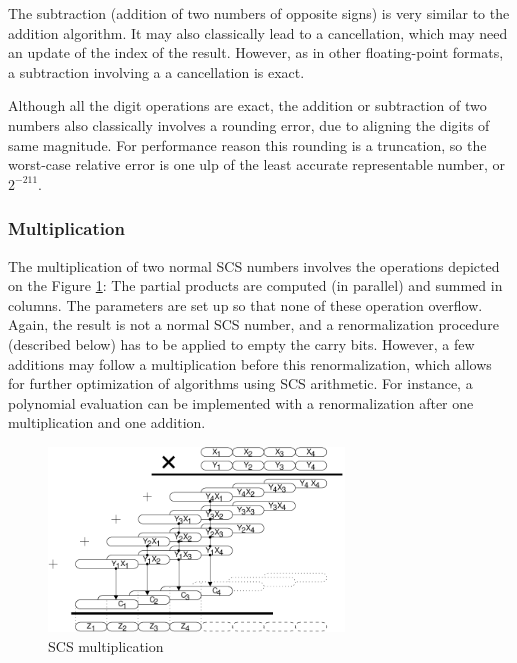 The subtraction (addition of two numbers of opposite signs) is very
similar to the addition algorithm. It may also classically lead to a
cancellation, which may need an update of the index of the result.
However, as in other floating-point formats, a subtraction involving a
a cancellation is exact.

Although all the digit operations are exact, the addition or
subtraction of two numbers also classically involves a rounding error,
due to aligning the digits of same magnitude. For performance reason
this rounding is a truncation, so the worst-case relative error is one
ulp of the least accurate representable number, or $2^{-211}$.




\subsubsection{Multiplication}

The multiplication of two normal SCS numbers involves the operations
depicted on the Figure \ref{fig:scsmultiplication}: The partial
products are computed (in parallel) and summed in columns. The
parameters are set up so that none of these operation overflow. Again,
the result is not a normal SCS number, and a renormalization procedure
(described below) has to be applied to empty the carry bits. However,
a few additions may follow a multiplication before this
renormalization, which allows for further optimization of algorithms
using SCS arithmetic. For instance, a polynomial evaluation can be
implemented with a renormalization after one multiplication and one
addition.

\begin{figure}[h]
\begin{center}
\includegraphics[width=0.7\textwidth]{fig_scs/multiplication}
\caption{SCS multiplication \label{fig:scsmultiplication}}
\end{center}
\end{figure}

